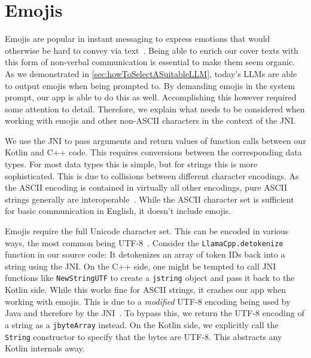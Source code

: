 \section{Emojis}
\label{sec:emojis}
Emojis are popular in instant messaging to express emotions that would otherwise be hard to convey via text~\cite{zhouGoodbyeTextHello2017}. Being able to enrich our cover texts with this form of non-verbal communication is essential to make them seem organic. As we demonstrated in \cref{sec:howToSelectASuitableLLM}, today's \glspl{LLM} are able to output emojis when being prompted to. By demanding emojis in the system prompt, our app is able to do this as well. Accomplishing this however required some attention to detail. Therefore, we explain what needs to be considered when working with emojis and other non-ASCII characters in the context of the \gls{JNI}.

We use the \gls{JNI} to pass arguments and return values of function calls between our Kotlin and C++ code. This requires conversions between the corresponding data types. For most data types this is simple, but for strings this is more sophisticated. This is due to collisions between different character encodings. As the ASCII encoding is contained in virtually all other encodings, pure ASCII strings generally are interoperable~\cite{gleaveMakingCompressionAlgorithms2017}. While the ASCII character set is sufficient for basic communication in English, it doesn't include emojis.

Emojis require the full Unicode character set. This can be encoded in various ways, the most common being UTF-8~\cite{gleaveMakingCompressionAlgorithms2017}. Consider the \lstinline|LlamaCpp.detokenize| function in our source code: It detokenizes an array of token IDs back into a string using the \gls{JNI}. On the C++ side, one might be tempted to call \gls{JNI} functions like \lstinline|NewStringUTF| to create a \lstinline|jstring| object and pass it back to the Kotlin side. While this works fine for ASCII strings, it crashes our app when working with emojis. This is due to a \textit{modified} UTF-8 encoding being used by Java and therefore by the \gls{JNI}~\cite{oracleJNIFunctions}. To bypass this, we return the UTF-8 encoding of a string as a \lstinline|jbyteArray| instead. On the Kotlin side, we explicitly call the \lstinline|String| constructor to specify that the bytes are UTF-8. This abstracts any Kotlin internals away.

